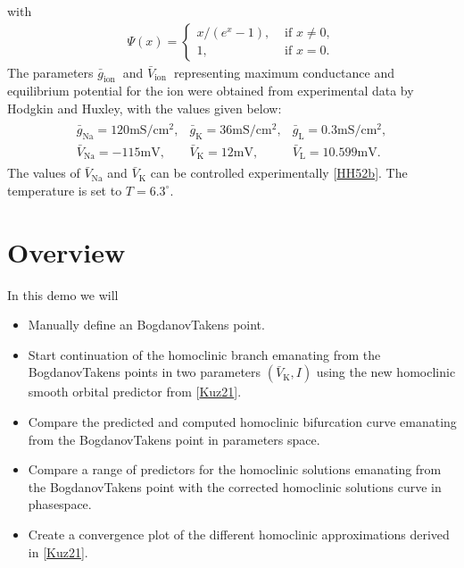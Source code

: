 \documentclass[letterpaper,10pt,english]{jupyterBook}
\begin{document}
\sphinxAtStartPar
with
\begin{equation*}
\begin{split}
\Psi(x) = \begin{cases}
    x /\left(e^{x}-1\right), & \text { if } x \neq 0, \\
    1, & \text { if } x=0.
\end{cases}
\end{split}
\end{equation*}
\sphinxAtStartPar
The parameters \(\bar{g}_{\text {ion }}\) and \(\bar{V}_{\text {ion }}\)
representing maximum conductance and equilibrium potential for the ion were
obtained from experimental data by Hodgkin and Huxley, with the values given
below:
\begin{equation*}
\begin{split}
\begin{array}{lll}
\bar{g}_{\mathrm{Na}}=120 \mathrm{mS} / \mathrm{cm}^{2}, &
\bar{g}_{\mathrm{K}}=36 \mathrm{mS} / \mathrm{cm}^{2}, &
\bar{g}_{\mathrm{L}}=0.3 \mathrm{mS} / \mathrm{cm}^{2}, \\
\bar{V}_{\mathrm{Na}}=-115 \mathrm{mV}, & \bar{V}_{\mathrm{K}}=12
\mathrm{mV}, & \bar{V}_{\mathrm{L}}=10.599 \mathrm{mV}.
\end{array}
\end{split}
\end{equation*}
\sphinxAtStartPar
The values of \(\bar{V}_{\mathrm{Na}}\) and \(\bar{V}_{\mathrm{K}}\) can be
controlled experimentally {[}\hyperlink{cite.references:id19}{HH52b}{]}.
The temperature is set to \(T=6.3^{\circ}\).


\section{Overview}
\label{\detokenize{HodgkinHuxley:overview}}
\sphinxAtStartPar
In this demo we will
\begin{itemize}
\item {} 
\sphinxAtStartPar
Manually define an Bogdanov\sphinxhyphen{}Takens point.

\item {} 
\sphinxAtStartPar
Start continuation of the homoclinic branch emanating from the
Bogdanov\sphinxhyphen{}Takens points in two parameters \((\bar{V}_{\mathrm K},I)\) using the
new homoclinic smooth orbital predictor from {[}\hyperlink{cite.references:id3}{Kuz21}{]}.

\item {} 
\sphinxAtStartPar
Compare the predicted and computed homoclinic bifurcation curve emanating from the
Bogdanov\sphinxhyphen{}Takens point in parameters space.

\item {} 
\sphinxAtStartPar
Compare a range of predictors for the homoclinic solutions emanating from the
Bogdanov\sphinxhyphen{}Takens point with the corrected homoclinic solutions curve in
phase\sphinxhyphen{}space.

\item {} 
\sphinxAtStartPar
Create a convergence plot of the different homoclinic approximations
derived in {[}\hyperlink{cite.references:id3}{Kuz21}{]}.

\end{itemize}
\end{document}
